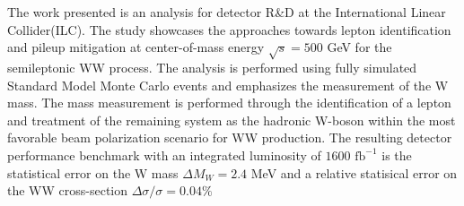 %

%

The work presented is an analysis for detector R\&D at the International Linear Collider(ILC). The study showcases the approaches towards lepton identification and pileup mitigation at center-of-mass energy $\sqrt{s} = 500$ GeV for the semileptonic WW process. The analysis is performed using fully simulated Standard Model Monte Carlo events and emphasizes the measurement of the W mass. The mass measurement is performed through the identification of a lepton and treatment of the remaining system as the hadronic W-boson within the most favorable beam polarization scenario for WW production. The resulting detector performance benchmark with an integrated luminosity of $1600 \, \, \text{fb}^{-1}$ is the statistical error on the W mass $\Delta M_W =  2.4 $ MeV and a relative statisical error on the WW cross-section $\Delta \sigma / \sigma = 0.04 \% $

